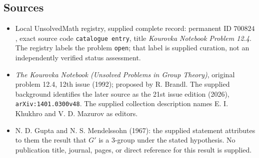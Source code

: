 \documentclass[11pt]{article}
\begin{document}
\subsection{Sources}
\begin{itemize}
\item Local UnsolvedMath registry, supplied complete record: permanent ID \(700824\), exact source code \texttt{catalogue entry}, title \emph{Kourovka Notebook Problem 12.4}. The registry labels the problem \texttt{open}; that label is supplied curation, not an independently verified status assessment.
\item \emph{The Kourovka Notebook (Unsolved Problems in Group Theory)}, original problem 12.4, 12th issue (1992); proposed by R. Brandl. The supplied background identifies the later source as the 21st issue edition (2026), \texttt{arXiv:1401.0300v48}. The supplied collection description names E. I. Khukhro and V. D. Mazurov as editors.
\item N. D. Gupta and N. S. Mendelssohn (1967): the supplied statement attributes to them the result that \(G'\) is a \(3\)-group under the stated hypothesis. No publication title, journal, pages, or direct reference for this result is supplied.
\end{itemize}
\end{document}
